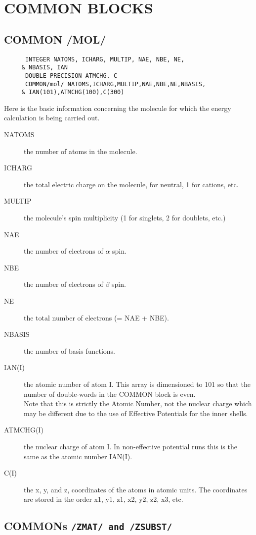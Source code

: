 \chapter{ COMMON BLOCKS}
\section{\sf COMMON /MOL/}
{\small
\begin{verbatim}
      INTEGER NATOMS, ICHARG, MULTIP, NAE, NBE, NE, 
     & NBASIS, IAN
      DOUBLE PRECISION ATMCHG. C
      COMMON/mol/ NATOMS,ICHARG,MULTIP,NAE,NBE,NE,NBASIS,
     & IAN(101),ATMCHG(100),C(300)
\end{verbatim}
}
Here is the basic information concerning the molecule for which
the energy calculation is being carried out.
\begin{description}
\item[NATOMS]  the number of atoms in the molecule.
\item[ICHARG]  the total electric charge on the molecule,
for neutral, 1 for cations, etc.
\item[MULTIP]  the molecule's spin multiplicity (1 for
singlets, 2 for doublets, etc.)
\item[NAE]  the number of electrons of $\alpha$ spin.
\item[NBE]  the number of electrons of $\beta$  spin.
\item[NE]  the total number of electrons (= NAE + NBE).
\item[NBASIS]  the number of basis functions.
\item[IAN(I)]   the atomic number of atom I.  This array is
dimensioned to 101 so that the number
of double-words in the COMMON block is even. \\
Note that this is strictly the Atomic Number, not the nuclear
charge which may be different due to the use of Effective
Potentials for the inner shells.
\item[ATMCHG(I)] the nuclear charge of atom I. In non-effective
potential runs this is the same as the atomic number IAN(I).
\item[C(I)]    the x, y, and z, coordinates of the atoms in
atomic units.  The coordinates are stored in
the order x1, y1, z1, x2, y2, z2, x3, etc.
\end{description}
\newpage
\section{\sf COMMONs {\tt /ZMAT/ and /ZSUBST/}}
